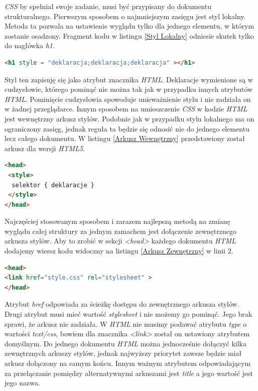 \documentclass{iiuwb}
\begin{document}
\textit{CSS} by spełniał swoje zadanie, musi być przypisany do dokumentu strukturalnego. Pierwszym sposobem o najmniejszym zasięgu jest styl lokalny. Metoda ta pozwala na ustawienie wyglądu tylko dla jednego elementu, w którym zostanie osadzony. Fragment kodu w listingu \ref{Styl Lokalny} odniesie skutek tylko do nagłówka \textit{h1}.
\begin{lstlisting}[language=HTML, label=Styl Lokalny, caption=Styl lokalny]
<h1 style = "deklaracja;deklaracja;deklaracja" ></h1>
\end{lstlisting} 
Styl ten zapisuję się jako atrybut znacznika \textit{HTML}. Deklaracje wymienione są w cudzysłowie, którego pominąć nie można tak jak w przypadku innych atrybutów \textit{HTML}. Pominięcie cudzysłowia spowoduje unieważnienie stylu i nie zadziała on w żadnej przeglądarce.
Innym sposobem na umieszczenie \textit{CSS} w kodzie \textit{HTML} jest wewnętrzny arkusz stylów. Podobnie jak w przypadku stylu lokalnego ma on ograniczony zasięg, jednak reguła ta będzie się odnosić nie do jednego elementu lecz całego dokumentu. W listingu \ref{Arkusz Wewnętrzny} przedstawiony został arkusz dla wersji \textit{HTML5}.
\begin{lstlisting}[language=HTML, label=Arkusz Wewnętrzny, caption=Wewnętrzny arkusz stylów]
<head>
 <style>
  selektor { deklaracje }
 </style>
</head>
\end{lstlisting}
Najczęściej stosowanym sposobem i zarazem najlepszą metodą na zmianę wyglądu całej struktury za jednym zamachem jest dołączenie zewnętrznego arkusza stylów. Aby to zrobić w sekcji \textit{<head>} każdego dokumentu \textit{HTML} dodajemy wiersz kodu widoczny na listingu \ref{Arkusz Zewnętrzny} w linii 2.
\begin{lstlisting}[language=HTML, label=Arkusz Zewnętrzny, caption=Zewnętrzny arkusz stylów]
<head>
<link href="style.css" rel="stylesheet" >
</head>
\end{lstlisting}
Atrybut \textit{href} odpowiada za ścieżkę dostępu do zewnętrznego arkusza stylów. Drugi atrybut musi mieć wartość \textit{stylesheet} i nie możemy go pominąć. Jego brak sprawi, że arkusz nie zadziała. W \textit{HTML} nie musimy podawać atrybutu \textit{type} o wartości \textit{text/css}, bowiem dla znacznika \textit{<link>} został on ustawiony atrybutem domyślnym. Do jednego dokumentu \textit{HTML} można jednocześnie dołączyć kilka zewnętrznych arkuszy stylów, jednak najwyższy priorytet zawsze będzie miał arkusz dołączony na samym końcu. Innym ważnym atrybutem odpowiadającym za przełączanie pomiędzy alternatywnymi arkuszami jest \textit{title} a jego wartość jest jego nazwa.
\end{document}
